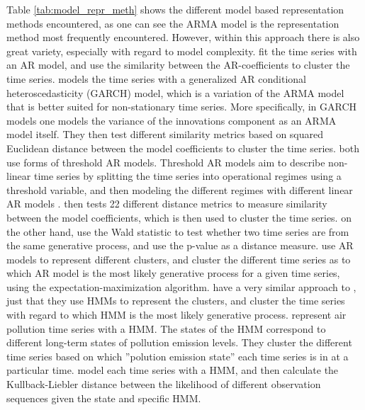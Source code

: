 Table \ref{tab:model_repr_meth} shows the different model based representation methods encountered, 
as one can see the ARMA model is the representation method most frequently encountered. 
However, within this approach there is also great variety, especially with regard to model complexity.
\textcite{shape_feat_mod_tsc_rfa, struct_damage_ar_fuzzy_c_means, ar_metric_trimmed_fuzzy_tsc_pm10, tsc_ar_metric_air_pollution} fit the time series with an AR model, and use the similarity between the AR-coefficients to cluster the time series. 
\textcite{garch_robust_tsc} models the time series with a generalized AR conditional heteroscedasticity (GARCH) model, which is a variation of the ARMA model that is better suited for non-stationary time series. 
More specifically, in GARCH models one models the variance of the innovations component as an ARMA model itself. 
They then test different similarity metrics based on squared Euclidean distance between the model coefficients to cluster the time series. 
\textcite{temporal_tsc_threshold_ar_models, fstar_hac_tsc} both use forms of threshold AR models. 
Threshold AR models aim to describe non-linear time series by splitting the time series into operational regimes using a threshold variable, and then modeling the different regimes with different linear AR models \cite{temporal_tsc_threshold_ar_models}. \textcite{temporal_tsc_threshold_ar_models} then tests 22 different distance metrics to measure similarity between the model coefficients, which is then used to cluster the time series. \textcite{fstar_hac_tsc} on the other hand, use the Wald statistic to test whether two time series are from the same generative process, and use the p-value as a distance measure.
\textcite{moar_mpl_tsc} use AR models to represent different clusters, and cluster the different time series as to which AR model is the most likely generative process for a given time series, using the expectation-maximization algorithm.
\textcite{mixture_gaussian_hmm} have a very similar approach to \textcite{moar_mpl_tsc}, just that they use HMMs to represent the clusters, and cluster the time series with regard to which HMM is the most likely generative process. 
\textcite{hmm_pm10_quantifying_impacts} represent air pollution time series with a HMM. 
The states of the HMM correspond to different long-term states of pollution emission levels.
They cluster the different time series based on which ''polution emission state'' each time series is in at a particular time. 
\textcite{multivariate_tsc_hmm} model each time series with a HMM, and then calculate the Kullback-Liebler distance between the likelihood of different observation sequences given the state and specific HMM. 
